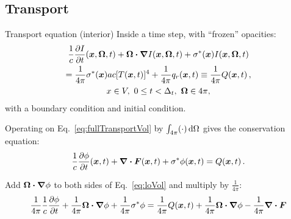 \documentclass{beamer}
\begin{document}
\subsection{Transport}
\begin{frame}{Transport equation (interior)}
Inside a time step, with ``frozen'' opacities:
\begin{multline} \label{eq:fullTransportVol}
  \frac{1}{c} \frac{\partial I}{\partial t}(\bm{x}, \bm{\Omega}, t)
    + \bm{\Omega}\bm{\cdot} \bm{\nabla} I(\bm{x}, \bm{\Omega}, t)
    + \sigma^\ast(\bm{x}) I (\bm{x}, \bm{\Omega}, t)
    \\
    = \frac{1}{4\pi} \sigma^\ast(\bm{x}) ac [T(\bm{x}, t)]^4
    + \frac{1}{4\pi} q_{r}(\bm{x}, t)
    \equiv \frac{1}{4\pi} Q(\bm{x}, t) \,,
\\
x \in V,\  0 \le t < \Delta_t, \ \bm{\Omega} \in 4\pi,
\end{multline}
with a boundary condition and initial condition.

Operating on Eq.~\eqref{eq:fullTransportVol} by $\int_{4\pi} (\cdot) \mathop{}\!\mathrm{d}\Omega$
gives the conservation equation:
\begin{equation} \label{eq:loVol}
\frac{1}{c} \frac{\partial \phi}{\partial t} (\bm{x}, t)
  + \bm{\nabla} \bm{\cdot}\bm{F}(\bm{x}, t)
  + \sigma^\ast \phi(\bm{x}, t)
  =  Q(\bm{x}, t)\,.
\end{equation}

Add $\bm{\Omega}\bm{\cdot}\bm{\nabla} \phi$ to both sides of Eq.~\eqref{eq:loVol} and
multiply by $\frac{1}{4\pi}$:
\begin{equation} \label{eq:modifiedConservation}
  \frac{1}{4\pi} \frac{1}{c} \frac{\partial \phi}{\partial t}
  + \frac{1}{4\pi} \bm{\Omega}\bm{\cdot}\bm{\nabla} \phi
  + \frac{1}{4\pi} \sigma^\ast \phi
  = \frac{1}{4\pi}  Q(\bm{x}, t) + \frac{1}{4\pi} \bm{\Omega}\bm{\cdot}\bm{\nabla} \phi
  - \frac{1}{4\pi} \bm{\nabla} \bm{\cdot}\bm{F}
\end{equation}
\end{frame}
\end{document}
